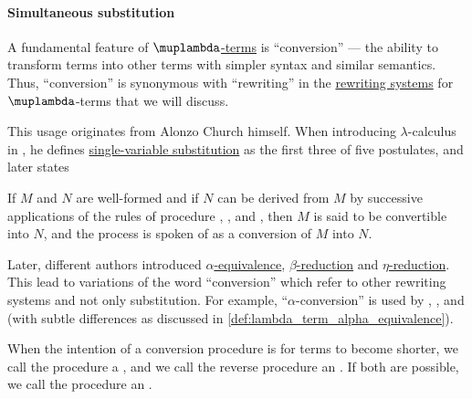\paragraph{Simultaneous substitution}

\begin{concept}\label{con:lambda_conversion}
  A fundamental feature of \hyperref[def:lambda_term]{\( \muplambda \)-terms} is \enquote{conversion} --- the ability to transform terms into other terms with simpler syntax and similar semantics. Thus, \enquote{conversion} is synonymous with \enquote{rewriting} in the \hyperref[def:rewriting_system]{rewriting systems} for \( \muplambda \)-terms that we will discuss.

  This usage originates from Alonzo Church himself. When introducing \( \lambda \)-calculus in \cite[357]{Church1932LambdaCalculus}, he defines \hyperref[def:atomic_lambda_term_substitution]{single-variable substitution} as the first three of five postulates, and later states
  \begin{displayquote}
    If \( M \) and \( N \) are well-formed and if \( N \) can be derived from \( M \) by successive applications of the rules of procedure , , and , then \( M \) is said to be convertible into \( N \), and the process is spoken of as a conversion of \( M \) into \( N \).
  \end{displayquote}

  Later, different authors introduced \hyperref[def:lambda_term_alpha_equivalence]{\( \alpha \)-equivalence}, \hyperref[def:beta_eta_reduction]{\( \beta \)-reduction} and \hyperref[def:beta_eta_reduction]{\( \eta \)-reduction}. This lead to variations of the word \enquote{conversion} which refer to other rewriting systems and not only substitution. For example, \enquote{\( \alpha \)-conversion} is used by \textcite[\S 2.1.11]{Barendregt1984LambdaCalculus}, \textcite[def. 1A8]{Hindley1997BasicSTT}, \textcite[114]{Mimram2020ProgramEqualsProof} and \textcite[5]{Pollack2005AlphaConversion} (with subtle differences as discussed in \cref{def:lambda_term_alpha_equivalence}).

  When the intention of a conversion procedure is for terms to become shorter, we call the procedure a , and we call the reverse procedure an . If both are possible, we call the procedure an .
\end{concept}

